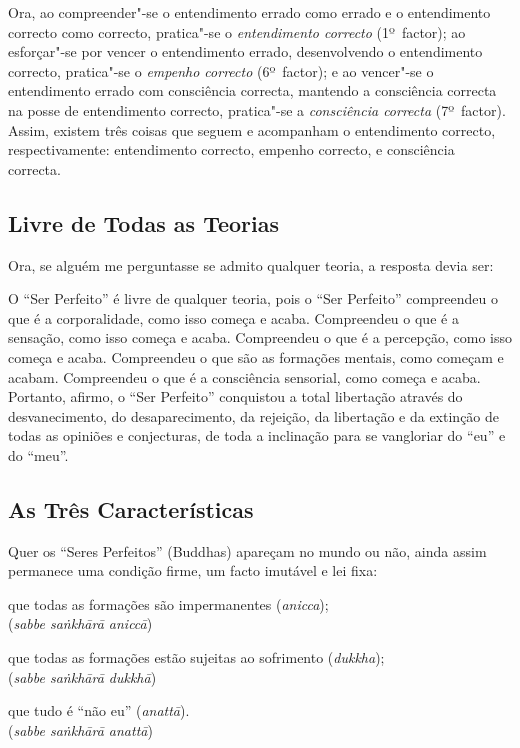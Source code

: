 Ora, ao compreender"-se o entendimento errado como errado e o entendimento
correcto como correcto, pratica"-se o \emph{entendimento correcto} (1º~factor);
ao esforçar"-se por vencer o entendimento errado, desenvolvendo o entendimento
correcto, pratica"-se o \emph{empenho correcto} (6º~factor); e ao vencer"-se o
entendimento errado com consciência correcta, mantendo a consciência correcta na
posse de entendimento correcto, pratica"-se a \emph{consciência correcta}
(7º~factor). Assim, existem três coisas que seguem e acompanham o entendimento
correcto, respectivamente: entendimento correcto, empenho correcto, e
consciência correcta.


\subsection{Livre de Todas as Teorias}

Ora, se alguém me perguntasse se admito qualquer teoria, a resposta devia ser:

O “Ser Perfeito” é livre de qualquer teoria, pois o “Ser Perfeito”
compreendeu o que é a corporalidade, como isso começa e acaba. Compreendeu o que
é a sensação, como isso começa e acaba. Compreendeu o que é a percepção, como
isso começa e acaba. Compreendeu o que são as formações mentais, como começam e
acabam. Compreendeu o que é a consciência sensorial, como começa e acaba.
Portanto, afirmo, o “Ser Perfeito” conquistou a total libertação através do
desvanecimento, do desaparecimento, da rejeição, da libertação e da extinção de
todas as opiniões e conjecturas, de toda a inclinação para se vangloriar do
“eu” e do “meu”.


\subsection{As Três Características}

Quer os “Seres Perfeitos” (Buddhas) apareçam no mundo ou não, ainda
assim permanece uma condição firme, um facto imutável e lei fixa:

que todas as formações são impermanentes (\emph{anicca});\\
(\emph{sabbe saṅkhārā aniccā})

que todas as formações estão sujeitas ao sofrimento (\emph{dukkha});\\
(\emph{sabbe saṅkhārā dukkhā})

que tudo é “não eu” (\emph{anattā}).\\
(\emph{sabbe saṅkhārā anattā})

